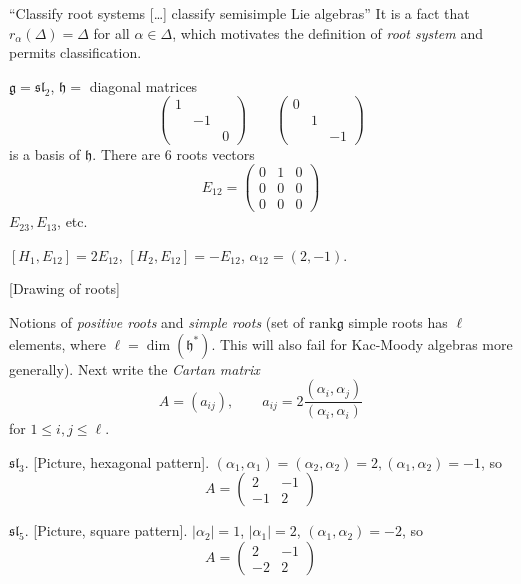 ``Classify root systems […] classify semisimple Lie algebras'' 
It is a fact that $r_\alpha (\Delta)=\Delta$ for all $\alpha \in \Delta$, 
which motivates the definition of {\it root system} 
and permits classification.

\begin{example}
\label{example-root-system-sl2}
$\mathfrak{g}=\mathfrak{sl}_2$, $\mathfrak{h}=$ diagonal matrices
$$
\begin{pmatrix}
1&&\\ 
&-1&\\
& & 0
\end{pmatrix}
\qquad 
\begin{pmatrix}
0&&\\ 
&1&\\
& & -1
\end{pmatrix}
$$
is a basis of $\mathfrak{h}$. There are 6 roots vectors
$$
E_{12}=
\begin{pmatrix}
0 & 1 & 0\\
0 & 0 & 0\\
0 & 0 & 0
\end{pmatrix}
$$
$E_{23},E_{13}$, etc.
\end{example}

\begin{exercise}
\label{exercise-basis-of-h}
$[H_1,E_{12}]=2E_{12}$, $[H_2,E_{12}]=-E_{12}$, $\alpha_{12}=(2,-1)$.
\end{exercise}

[Drawing of roots]

Notions of {\it positive roots} and {\it simple roots} 
(set of $\text{rank}\mathfrak{g}$ simple roots has $\ell$ elements,
 where $\ell=\dim(\mathfrak{h}^*)$.  
This will also fail for Kac-Moody algebras more generally). 
Next write the {\it Cartan matrix}
$$
A=(a_{ij}),\qquad  a_{ij}=2\frac{(\alpha_i,\alpha_j)}{(\alpha_i,\alpha_i)}
$$
for $1\leq i,j \leq \ell$.

\begin{example}
\label{example-Cartan-matrix-sl3}
$\mathfrak{sl}_3$. [Picture, hexagonal pattern]. 
$(\alpha_1,\alpha_1)=(\alpha_2,\alpha_2)=2,(\alpha_1,\alpha_2)=-1$, so
$$
A=\begin{pmatrix}
2&-1\\ 
-1&2
\end{pmatrix}
$$
\end{example}

\begin{example}
\label{example-Cartan-matrix-sl5}
$\mathfrak{sl}_5$. [Picture, square pattern]. $|\alpha_2|=1$, $|\alpha_1|=2$,
$(\alpha_1,\alpha_2)=-2$, so
$$
A=\begin{pmatrix}
2&-1\\ 
-2&2
\end{pmatrix}
$$
\end{example}

